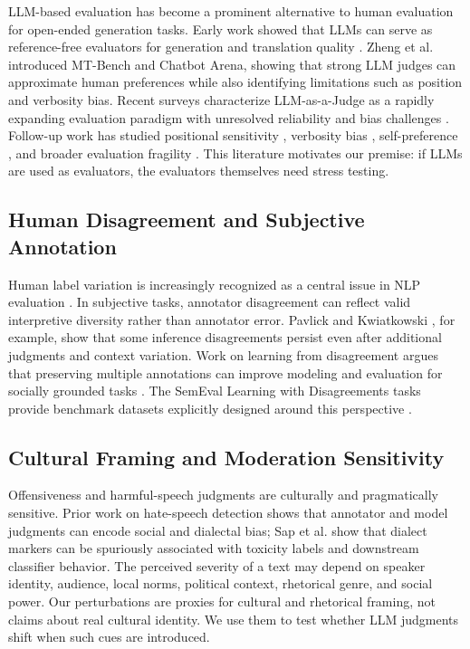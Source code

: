 \documentclass[11pt]{article}
\begin{document}
LLM-based evaluation has become a prominent alternative to human evaluation for open-ended generation tasks. Early work showed that LLMs can serve as reference-free evaluators for generation and translation quality \cite{liu2023geval,kocmi2023large}. Zheng et al. \cite{zheng2023judging} introduced MT-Bench and Chatbot Arena, showing that strong LLM judges can approximate human preferences while also identifying limitations such as position and verbosity bias. Recent surveys characterize LLM-as-a-Judge as a rapidly expanding evaluation paradigm with unresolved reliability and bias challenges \cite{gu2024survey}. Follow-up work has studied positional sensitivity \cite{wang2023large,wang2025judging}, verbosity bias \cite{saito2023verbosity}, self-preference \cite{panickssery2024llm,li2024justice}, and broader evaluation fragility \cite{li2024justice}. This literature motivates our premise: if LLMs are used as evaluators, the evaluators themselves need stress testing.

\subsection{Human Disagreement and Subjective Annotation}

Human label variation is increasingly recognized as a central issue in NLP evaluation \cite{plank2022problem}. In subjective tasks, annotator disagreement can reflect valid interpretive diversity rather than annotator error. Pavlick and Kwiatkowski \cite{pavlick2019inherent}, for example, show that some inference disagreements persist even after additional judgments and context variation. Work on learning from disagreement argues that preserving multiple annotations can improve modeling and evaluation for socially grounded tasks \cite{uma2021semeval,leonardelli2023semeval,davani2022dealing}. The SemEval Learning with Disagreements tasks provide benchmark datasets explicitly designed around this perspective \cite{uma2021semeval,leonardelli2023semeval}.

\subsection{Cultural Framing and Moderation Sensitivity}

Offensiveness and harmful-speech judgments are culturally and pragmatically sensitive. Prior work on hate-speech detection shows that annotator and model judgments can encode social and dialectal bias; Sap et al. \cite{sap2019risk} show that dialect markers can be spuriously associated with toxicity labels and downstream classifier behavior. The perceived severity of a text may depend on speaker identity, audience, local norms, political context, rhetorical genre, and social power. Our perturbations are proxies for cultural and rhetorical framing, not claims about real cultural identity. We use them to test whether LLM judgments shift when such cues are introduced.
\end{document}
